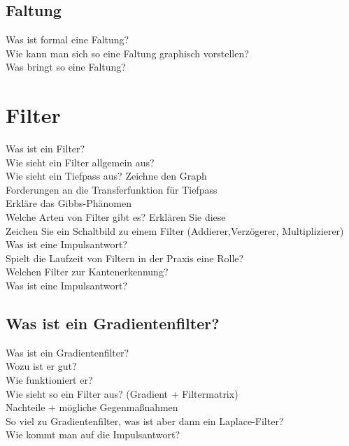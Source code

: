 \subsection{Faltung}
\begin{description}
  \item[Was ist formal eine Faltung?]
  \item[Wie kann man sich so eine Faltung graphisch vorstellen?]
  \item[Was bringt so eine Faltung?]
\end{description}
\section{Filter}
\begin{description}
	\item[Was ist ein Filter?]
	\item[Wie sieht ein Filter allgemein aus?]
	\item[Wie sieht ein Tiefpass aus? Zeichne den Graph]
	\item[Forderungen an die Transferfunktion für Tiefpass]
	\item[Erkläre das Gibbs-Phänomen]
	\item[Welche Arten von Filter gibt es? Erklären Sie diese]
	\item[Zeichen Sie ein Schaltbild zu einem Filter (Addierer,Verzögerer, Multiplizierer)]
    \item[Was ist eine Impulsantwort?]
	\item[Spielt die Laufzeit von Filtern in der Praxis eine Rolle?]
	\item[Welchen Filter zur Kantenerkennung?]
	\item[Was ist eine Impulsantwort?]
\end{description}
\subsection{Was ist ein Gradientenfilter?}
\begin{description}
    \item[Was ist ein Gradientenfilter?]
	\item[Wozu ist er gut?]
	\item[Wie funktioniert er?]
	\item[Wie sieht so ein Filter aus? (Gradient + Filtermatrix)]
	\item[Nachteile + mögliche Gegenmaßnahmen]
    \item[So viel zu Gradientenfilter, was ist aber dann ein Laplace-Filter?]
	\item[Wie kommt man auf die Impulsantwort?]
\end{description}
